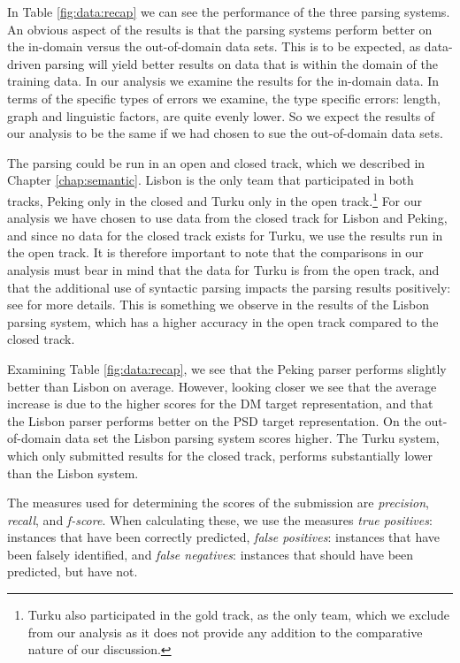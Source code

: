 In Table \ref{fig:data:recap} we can see the performance of the three parsing systems. An obvious aspect of the results is that the parsing systems perform better on the in-domain versus the out-of-domain data sets. This is to be expected, as data-driven parsing will yield better results on data that is within the domain of the training data. In our analysis we examine the results for the in-domain data. In terms of the specific types of errors we examine, the type specific errors: length, graph and linguistic factors, are quite evenly lower. So we expect the results of our analysis to be the same if we had chosen to sue the out-of-domain data sets.

The parsing could be run in an open and closed track, which we described in Chapter \ref{chap:semantic}. Lisbon is the only team that participated in both tracks, Peking only in the closed and Turku only in the open track.\footnote{Turku also participated in the gold track, as the only team, which we exclude from our analysis as it does not provide any addition to the comparative nature of our discussion.} For our analysis we have chosen to use data from the closed track for Lisbon and Peking, and since no data for the closed track exists for Turku, we use the results run in the open track. It is therefore important to note that the comparisons in our analysis must bear in mind that the data for Turku is from the open track, and that the additional use of syntactic parsing impacts the parsing results positively: see  for more details. This is something we observe in the results of the Lisbon parsing system, which has a higher accuracy in the open track compared to the closed track.

Examining Table \ref{fig:data:recap}, we see that the Peking parser performs slightly better than Lisbon on average. However, looking closer we see that the average increase is due to the higher scores for the DM target representation, and that the Lisbon parser performs better on the PSD target representation. On the out-of-domain data set the Lisbon parsing system scores higher. The Turku system, which only submitted results for the closed track, performs substantially lower than the Lisbon system.

The measures used for determining the scores of the submission are \textit{precision}, \textit{recall}, and \textit{f-score}. When calculating these, we use the measures \textit{true positives}: instances that have been correctly predicted, \textit{false positives}: instances that have been falsely identified, and \textit{false negatives}: instances that should have been predicted, but have not.

